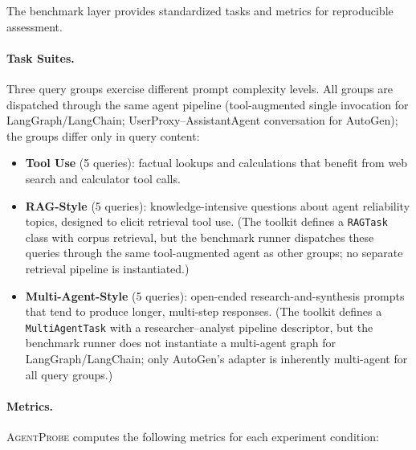 \documentclass[make,article,submit,moreauthors,pdftex]{mdpi}
\providecommand{\agentprobe}{\textsc{AgentProbe}}
\begin{document}
The benchmark layer provides standardized tasks and metrics for reproducible assessment.

\paragraph{Task Suites.}
Three query groups exercise different prompt complexity levels. All groups are dispatched through the same agent pipeline (tool-augmented single invocation for LangGraph/LangChain; UserProxy--AssistantAgent conversation for AutoGen); the groups differ only in query content:

\begin{itemize}
  \item \textbf{Tool Use} (5 queries): factual lookups and calculations that benefit from web search and calculator tool calls.
  \item \textbf{RAG-Style} (5 queries): knowledge-intensive questions about agent reliability topics, designed to elicit retrieval tool use. (The toolkit defines a \texttt{RAGTask} class with corpus retrieval, but the benchmark runner dispatches these queries through the same tool-augmented agent as other groups; no separate retrieval pipeline is instantiated.)
  \item \textbf{Multi-Agent-Style} (5 queries): open-ended research-and-synthesis prompts that tend to produce longer, multi-step responses. (The toolkit defines a \texttt{MultiAgentTask} with a researcher--analyst pipeline descriptor, but the benchmark runner does not instantiate a multi-agent graph for LangGraph/LangChain; only AutoGen's adapter is inherently multi-agent for all query groups.)
\end{itemize}

\paragraph{Metrics.}
\agentprobe{} computes the following metrics for each experiment condition:
\end{document}
